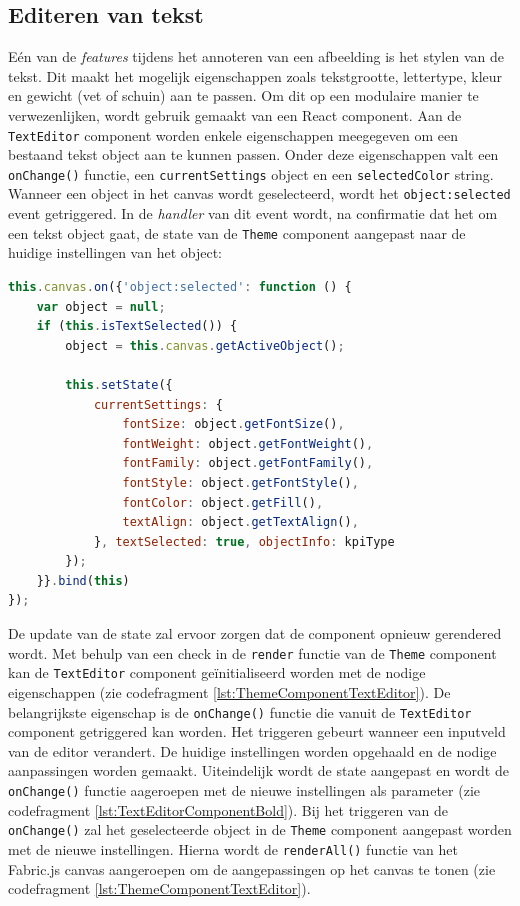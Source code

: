 \subsection{Editeren van tekst}
E\'{e}n van de \textit{features} tijdens het annoteren van een afbeelding is het stylen van de tekst. Dit maakt het mogelijk eigenschappen zoals tekstgrootte, lettertype, kleur en gewicht (vet of schuin) aan te passen. Om dit op een modulaire manier te verwezenlijken, wordt gebruik gemaakt van een React component. Aan de \texttt{TextEditor} component worden enkele eigenschappen meegegeven om een bestaand tekst object aan te kunnen passen. Onder deze eigenschappen valt een \texttt{onChange()} functie, een \texttt{currentSettings} object en een \texttt{selectedColor} string. Wanneer een object in het canvas wordt geselecteerd, wordt het  \texttt{object:selected} event getriggered. In de \textit{handler} van dit event wordt, na confirmatie dat het om een tekst object gaat, de state van de \texttt{Theme} component aangepast naar de huidige instellingen van het object: 

\begin{lstlisting}[language=javascript]
this.canvas.on({'object:selected': function () {
	var object = null;
	if (this.isTextSelected()) {
		object = this.canvas.getActiveObject();

		this.setState({
			currentSettings: {
				fontSize: object.getFontSize(),
				fontWeight: object.getFontWeight(),
				fontFamily: object.getFontFamily(),
				fontStyle: object.getFontStyle(),
				fontColor: object.getFill(),
				textAlign: object.getTextAlign(),
			}, textSelected: true, objectInfo: kpiType
		});
	}}.bind(this)
});
\end{lstlisting}

De update van de state zal ervoor zorgen dat de component opnieuw gerendered wordt. Met behulp van een check in de \texttt{render} functie van de \texttt{Theme} component kan de \texttt{TextEditor} component ge\"{i}nitialiseerd worden met de nodige eigenschappen (zie codefragment \ref{lst:ThemeComponentTextEditor}). De belangrijkste eigenschap is de \texttt{onChange()} functie die vanuit de \texttt{TextEditor} component getriggered kan worden. Het triggeren gebeurt wanneer een inputveld van de editor verandert. De huidige instellingen worden opgehaald en de nodige aanpassingen worden gemaakt. Uiteindelijk wordt de state aangepast en wordt de \texttt{onChange()} functie aageroepen met de nieuwe instellingen als parameter (zie codefragment \ref{lst:TextEditorComponentBold}). Bij het triggeren van de \texttt{onChange()} zal het geselecteerde object in de \texttt{Theme} component aangepast worden met de nieuwe instellingen. Hierna wordt de \texttt{renderAll()} functie van het Fabric.js canvas aangeroepen om de aangepassingen op het canvas te tonen (zie codefragment \ref{lst:ThemeComponentTextEditor}).

